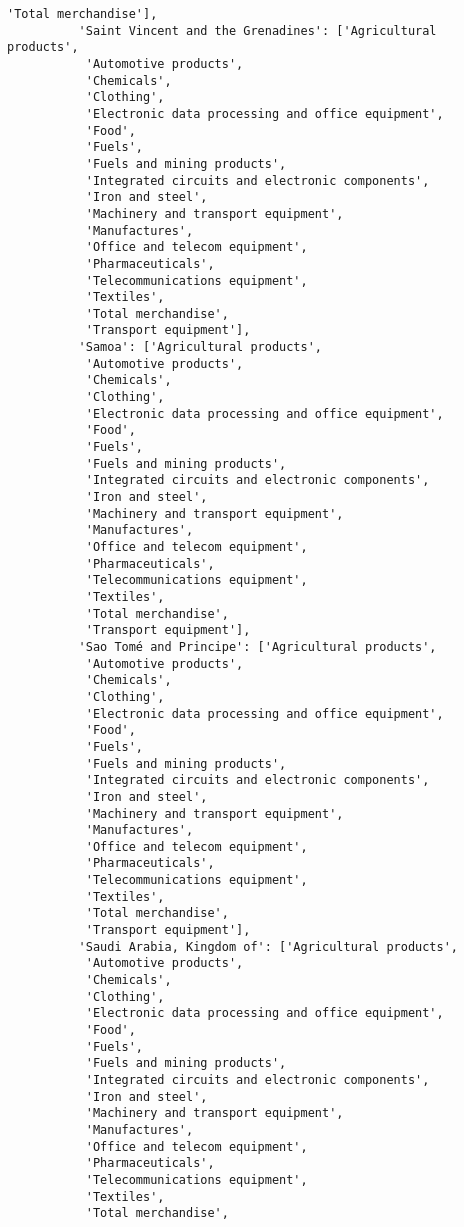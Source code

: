 \documentclass[11pt]{article}
\begin{document}
\begin{Verbatim}[commandchars=\\\{\}]
           'Total merchandise'],
          'Saint Vincent and the Grenadines': ['Agricultural products',
           'Automotive products',
           'Chemicals',
           'Clothing',
           'Electronic data processing and office equipment',
           'Food',
           'Fuels',
           'Fuels and mining products',
           'Integrated circuits and electronic components',
           'Iron and steel',
           'Machinery and transport equipment',
           'Manufactures',
           'Office and telecom equipment',
           'Pharmaceuticals',
           'Telecommunications equipment',
           'Textiles',
           'Total merchandise',
           'Transport equipment'],
          'Samoa': ['Agricultural products',
           'Automotive products',
           'Chemicals',
           'Clothing',
           'Electronic data processing and office equipment',
           'Food',
           'Fuels',
           'Fuels and mining products',
           'Integrated circuits and electronic components',
           'Iron and steel',
           'Machinery and transport equipment',
           'Manufactures',
           'Office and telecom equipment',
           'Pharmaceuticals',
           'Telecommunications equipment',
           'Textiles',
           'Total merchandise',
           'Transport equipment'],
          'Sao Tomé and Principe': ['Agricultural products',
           'Automotive products',
           'Chemicals',
           'Clothing',
           'Electronic data processing and office equipment',
           'Food',
           'Fuels',
           'Fuels and mining products',
           'Integrated circuits and electronic components',
           'Iron and steel',
           'Machinery and transport equipment',
           'Manufactures',
           'Office and telecom equipment',
           'Pharmaceuticals',
           'Telecommunications equipment',
           'Textiles',
           'Total merchandise',
           'Transport equipment'],
          'Saudi Arabia, Kingdom of': ['Agricultural products',
           'Automotive products',
           'Chemicals',
           'Clothing',
           'Electronic data processing and office equipment',
           'Food',
           'Fuels',
           'Fuels and mining products',
           'Integrated circuits and electronic components',
           'Iron and steel',
           'Machinery and transport equipment',
           'Manufactures',
           'Office and telecom equipment',
           'Pharmaceuticals',
           'Telecommunications equipment',
           'Textiles',
           'Total merchandise',

\end{Verbatim}
\end{document}
